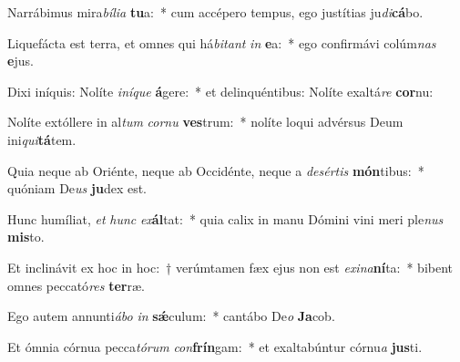 \item Narrábimus mira\textit{bí}\textit{li}\textit{a} \textbf{tu}a:~* cum accépero tempus, ego justítias ju\textit{di}\textbf{cá}bo.
\item Liquefácta est terra, et omnes qui há\textit{bi}\textit{tant} \textit{in} \textbf{e}a:~* ego confirmávi colúm\textit{nas} \textbf{e}jus.
\item Dixi iníquis: Nolíte \textit{in}\textit{í}\textit{que} \textbf{á}gere:~* et delinquéntibus: Nolíte exaltá\textit{re} \textbf{cor}nu:
\item Nolíte extóllere in al\textit{tum} \textit{cor}\textit{nu} \textbf{ves}trum:~* nolíte loqui advérsus Deum ini\textit{qui}\textbf{tá}tem.
\item Quia neque ab Oriénte, neque ab Occidénte, neque a \textit{de}\textit{sér}\textit{tis} \textbf{món}tibus:~* quóniam De\textit{us} \textbf{ju}dex est.
\item Hunc humíliat, \textit{et} \textit{hunc} \textit{ex}\textbf{ál}tat:~* quia calix in manu Dómini vini meri ple\textit{nus} \textbf{mis}to.
\item Et inclinávit ex hoc in hoc:~† verúmtamen fæx ejus non est \textit{ex}\textit{i}\textit{na}\textbf{ní}ta:~* bibent omnes peccató\textit{res} \textbf{ter}ræ.
\item Ego autem annunti\textit{á}\textit{bo} \textit{in} \textbf{sǽ}culum:~* cantábo De\textit{o} \textbf{Ja}cob.
\item Et ómnia córnua pecca\textit{tó}\textit{rum} \textit{con}\textbf{frín}gam:~* et exaltabúntur córnu\textit{a} \textbf{jus}ti.
